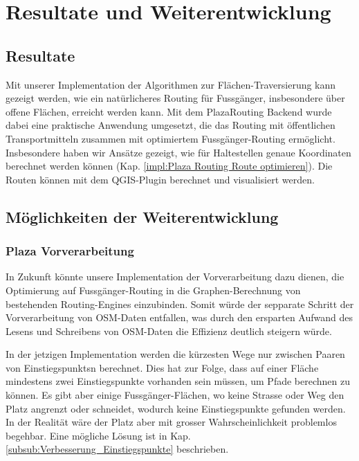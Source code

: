 
\section{Resultate und Weiterentwicklung}
\label{sec:Resultate und Weiterentwicklung}

\subsection{Resultate}
\label{sub:Resultate}

Mit unserer Implementation der Algorithmen zur Flächen-Traversierung kann gezeigt werden, wie ein natürlicheres Routing für Fussgänger, insbesondere über offene Flächen, erreicht werden kann. Mit dem PlazaRouting Backend wurde dabei eine praktische Anwendung umgesetzt, die das Routing mit öffentlichen Transportmitteln zusammen mit optimiertem Fussgänger-Routing ermöglicht. Insbesondere haben wir Ansätze gezeigt, wie für Haltestellen genaue Koordinaten berechnet werden können (Kap. \ref{impl:Plaza Routing Route optimieren}). Die Routen können mit dem QGIS-Plugin berechnet und visualisiert werden.

\subsection{Möglichkeiten der Weiterentwicklung}
\label{sub:Möglichkeiten der Weiterentwicklung}


\subsubsection{Plaza Vorverarbeitung}
\label{subsub:Weiterentwicklung_Vorverarbeitung}

In Zukunft könnte unsere Implementation der Vorverarbeitung dazu dienen, die Optimierung auf Fussgänger-Routing in die Graphen-Berechnung von bestehenden Routing-Engines einzubinden. Somit würde der sepparate Schritt der Vorverarbeitung von \ac{OSM}-Daten entfallen, was durch den ersparten Aufwand des Lesens und Schreibens von \ac{OSM}-Daten die Effizienz deutlich steigern würde.

In der jetzigen Implementation werden die kürzesten Wege nur zwischen Paaren von \glspl{Einstiegspunkt}n berechnet. Dies hat zur Folge, dass auf einer Fläche mindestens zwei Einstiegspunkte vorhanden sein müssen, um Pfade berechnen zu können. Es gibt aber einige Fussgänger-Flächen, wo keine Strasse oder Weg den Platz angrenzt oder schneidet, wodurch keine Einstiegspunkte gefunden werden. In der Realität wäre der Platz aber mit grosser Wahrscheinlichkeit problemlos begehbar. Eine mögliche Lösung ist in Kap. \ref{subsub:Verbesserung_Einstiegspunkte} beschrieben.


